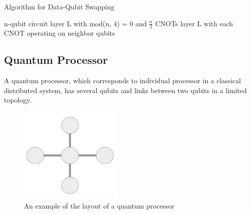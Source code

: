 \begin{algorithm}
 \caption{Algorithm for Data-Qubit Swapping}
 \begin{algorithmic}[1]
  \Require n-qubit circuit layer L with mod(n, 4) = 0 and $\frac{n}{2}$ CNOTs
  \Ensure  layer L with each CNOT operating on neighbor qubits
    \Else
    \EndIf
    
    \EndIf
    
\EndFunction

 \end{algorithmic} 
 \end{algorithm}



 \subsection{Quantum Processor}
  A quantum processor, which corresponds to individual processor in a classical distributed system, has several qubits and links between two qubits in a limited topology.
  
  	 \begin{figure}[h]
  		\begin{center}
  			\includegraphics[width=5cm]{img/processor.png}
			\caption{An example of the layout of a quantum processor}
			\label{Fig4}
		\end{center}
	\end{figure}
	
